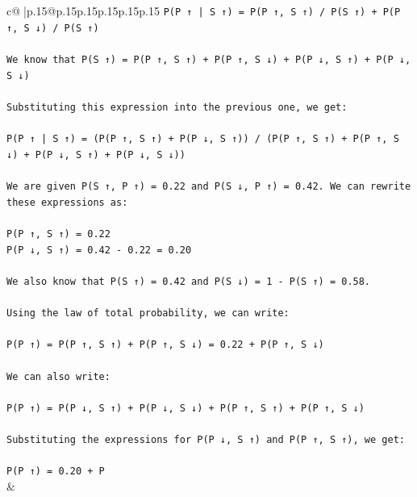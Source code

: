 \documentclass{article}
\begin{document}
{\begin{supertabular}{c@{$\;$}|p{.15\linewidth}@{}p{.15\linewidth}p{.15\linewidth}p{.15\linewidth}p{.15\linewidth}p{.15\linewidth}}
{{{\texttt{P(P ↑ | S ↑) = P(P ↑, S ↑) / P(S ↑) + P(P ↑, S ↓) / P(S ↑)} \\
\\ 
\texttt{We know that P(S ↑) = P(P ↑, S ↑) + P(P ↑, S ↓) + P(P ↓, S ↑) + P(P ↓, S ↓)} \\
\\ 
\texttt{Substituting this expression into the previous one, we get:} \\
\\ 
\texttt{P(P ↑ | S ↑) = (P(P ↑, S ↑) + P(P ↓, S ↑)) / (P(P ↑, S ↑) + P(P ↑, S ↓) + P(P ↓, S ↑) + P(P ↓, S ↓))} \\
\\ 
\texttt{We are given P(S ↑, P ↑) = 0.22 and P(S ↓, P ↑) = 0.42. We can rewrite these expressions as:} \\
\\ 
\texttt{P(P ↑, S ↑) = 0.22} \\
\texttt{P(P ↓, S ↑) = 0.42 {-} 0.22 = 0.20} \\
\\ 
\texttt{We also know that P(S ↑) = 0.42 and P(S ↓) = 1 {-} P(S ↑) = 0.58.} \\
\\ 
\texttt{Using the law of total probability, we can write:} \\
\\ 
\texttt{P(P ↑) = P(P ↑, S ↑) + P(P ↑, S ↓) = 0.22 + P(P ↑, S ↓)} \\
\\ 
\texttt{We can also write:} \\
\\ 
\texttt{P(P ↑) = P(P ↓, S ↑) + P(P ↓, S ↓) + P(P ↑, S ↑) + P(P ↑, S ↓)} \\
\\ 
\texttt{Substituting the expressions for P(P ↓, S ↑) and P(P ↑, S ↑), we get:} \\
\\ 
\texttt{P(P ↑) = 0.20 + P} \\
            }
        }
    }
    & \\ \\


\end{supertabular}}
\end{document}
